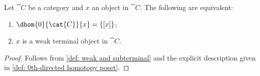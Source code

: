 
    \begingroup
    \def\theproposition{\ref{prop:dhom0_trivial_when_weak_terminal}}
    \begin{proposition}
        Let $\cat{C}$ be a category and $x$ an object in $\cat{C}$.
        The following are equivalent:
        \begin{enumerate}[label=(\alph*)]
            \item $\dhom{0}{\cat{C}}{x} = \{[x]\}$;
            \item $x$ is a weak terminal object in $\cat{C}$.
        \end{enumerate}
    \end{proposition}
    \addtocounter{proposition}{-1}
    \endgroup
    \begin{proof}
        Follows from \autoref{def: weak and subterminal} and the explicit description given in \autoref{def: 0th-directed homotopy poset}.
    \end{proof}


